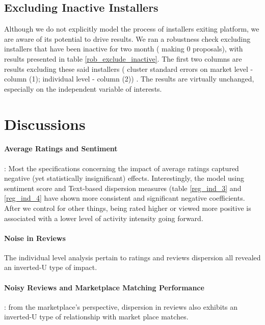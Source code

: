 \documentclass[msom,blindrev]{informs3}
\begin{document}
\subsection{Excluding Inactive Installers}
Although we do not explicitly model the process of installers exiting platform, we are aware of its potential to drive results. We ran a robustness check excluding installers that have been inactive for two month ( making 0 proposals), with results presented in table \ref{rob_exclude_inactive}. The first two columns are results excluding these said installers ( cluster standard errors on market level - column (1); individual level - column (2)) . The results are virtually unchanged, especially on the independent variable of interests.


\section{Discussions}

\paragraph{Average Ratings and Sentiment} : Most the specifications concerning the impact of average ratings captured negative (yet statistically insignificant) effects.  Interestingly, the model using sentiment score and Text-based dispersion measures (table \ref{reg_ind_3} and \ref{reg_ind_4} have shown more consistent and significant negative coefficients. After we control for other things, being rated higher or viewed more positive is associated with a lower level of activity intensity going forward. \\

\paragraph{Noise in Reviews} The individual level analysis pertain to ratings and reviews dispersion all revealed an inverted-U type of impact.

\paragraph{Noisy Reviews and Marketplace Matching Performance}: from the marketplace's perspective, dispersion in reviews also exhibits an inverted-U type of relationship with market place matches.
\end{document}
